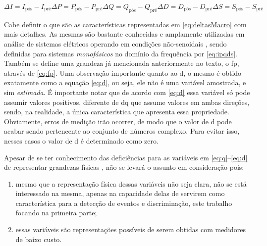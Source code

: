\begin{subequations} \label{eq:deltasMacro}
\begin{equation} \label{eq:dI}
\Delta I = I_{\text{pós}} - I_{\text{pré}}
\end{equation}
\begin{equation} \label{eq:dP}
\Delta P = P_{\text{pós}} - P_{\text{pré}}
\end{equation}
\begin{equation} \label{eq:dQ}
\Delta Q = Q_{\text{pós}} - Q_{\text{pré}}
\end{equation}
\begin{equation} \label{eq:dD}
\Delta D = D_{\text{pós}} - D_{\text{pré}}
\end{equation}
\begin{equation} \label{eq:dS}
\Delta S = S_{\text{pós}} - S_{\text{pré}}
\end{equation}
\end{subequations}

Cabe definir o que são as características representadas em
\ref{eq:deltasMacro} com mais detalhes. As mesmas são bastante
conhecidas e amplamente utilizadas em análise de sistemas elétricos
operando em condições não-senoidais \cite{akagi2007instantaneous},
sendo definidas para sistemas \emph{monofásicos} no domínio da
frequência por \ref{eq:ipqds}. Também se define uma grandeza já
mencionada anteriormente no texto, o \gls{fp}, através de \ref{eq:fp}.
Uma observação importante quanto ao \acs{d}, o mesmo é obtido
exatamente como a equação \ref{eq:d}, ou seja, ele não é uma
variável amostrada, e sim \emph{estimada}. É importante notar que de
acordo com \ref{eq:d} essa variável só pode assumir valores positivos,
diferente de \acs{dq} que assume valores em ambas direções, sendo, na
realidade, a única característica que apresenta essa propriedade.
Obviamente, erros de medição irão ocorrer, de modo que o valor de
\acs{d} pode acabar sendo pertencente ao conjunto de números complexo.
Para evitar isso, nesses casos o valor de \acs{d} é determinado como
zero.

Apesar de se ter conhecimento das deficiências para as variáveis em
\ref{eq:q}--\ref{eq:d} de representar grandezas físicas \cite[cap.
2]{akagi2007instantaneous}, não se levará o assunto em consideração
pois: 

\begin{enumerate}
\item mesmo que a representação física dessas variáveis não seja clara, 
não se está interessado na mesma, apenas na capacidade delas de
servirem como característica para a detecção de eventos e
discriminação, este trabalho focando na primeira parte;
\item essas variáveis são representações possíveis de serem obtidas com
medidores de baixo custo. 
\end{enumerate}

